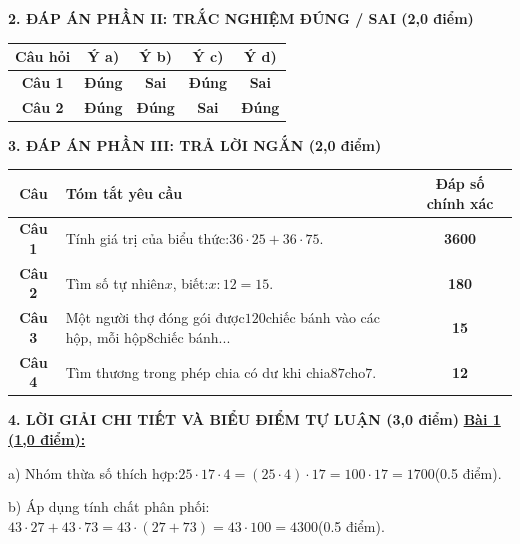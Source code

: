 \documentclass[11pt,a4paper]{article}
\begin{document}
\noindent\textbf{\large 2. ĐÁP ÁN PHẦN II: TRẮC NGHIỆM ĐÚNG / SAI (2,0 điểm)}
\vspace{4pt}
\begin{center}
\begin{tabular}{|c|c|c|c|c|}
\hline
\textbf{Câu hỏi} & \textbf{Ý a)} & \textbf{Ý b)} & \textbf{Ý c)} & \textbf{Ý d)} \\
\hline
\textbf{Câu 1} & \textbf{Đúng} & \textbf{Sai} & \textbf{Đúng} & \textbf{Sai} \\
\hline
\textbf{Câu 2} & \textbf{Đúng} & \textbf{Đúng} & \textbf{Sai} & \textbf{Đúng} \\
\hline
\end{tabular}
\end{center}
\vspace{6pt}


\noindent\textbf{\large 3. ĐÁP ÁN PHẦN III: TRẢ LỜI NGẮN (2,0 điểm)}
\vspace{4pt}
\begin{center}
\begin{tabular}{|c|m{11cm}|c|}
\hline
\textbf{Câu} & \textbf{Tóm tắt yêu cầu} & \textbf{Đáp số chính xác} \\
\hline
\textbf{Câu 1} & Tính giá trị của biểu thức:$36 \cdot 25 + 36 \cdot 75$. & \textbf{3600} \\
\hline
\textbf{Câu 2} & Tìm số tự nhiên$x$, biết:$x : 12 = 15$. & \textbf{180} \\
\hline
\textbf{Câu 3} & Một người thợ đóng gói được$120$chiếc bánh vào các hộp, mỗi hộp$8$chiếc bánh... & \textbf{15} \\
\hline
\textbf{Câu 4} & Tìm thương trong phép chia có dư khi chia$87$cho$7$. & \textbf{12} \\
\hline
\end{tabular}
\end{center}
\vspace{6pt}


\noindent\textbf{\large 4. LỜI GIẢI CHI TIẾT VÀ BIỂU ĐIỂM TỰ LUẬN (3,0 điểm)}
\vspace{4pt}
\noindent\textbf{\underline{Bài 1 (1,0 điểm):}}\par\vspace{3pt}
a) Nhóm thừa số thích hợp:$25 \cdot 17 \cdot 4 = (25 \cdot 4) \cdot 17 = 100 \cdot 17 = 1700$(0.5 điểm).\par\noindent b) Áp dụng tính chất phân phối:$43 \cdot 27 + 43 \cdot 73 = 43 \cdot (27 + 73) = 43 \cdot 100 = 4300$(0.5 điểm).\par\vspace{8pt}
\end{document}
